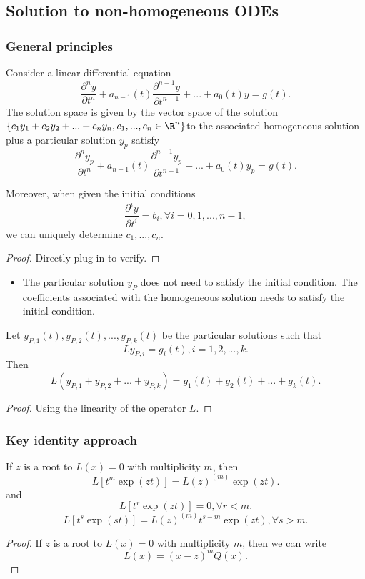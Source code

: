 \begin{refsection}
\subsection{Solution to non-homogeneous ODEs}
\subsubsection{General principles}
\begin{theorem}
	Consider a linear differential equation
	$$\frac{\partial^n y}{\partial t^n} + a_{n-1}(t)\frac{\partial^{n-1} y}{\partial t^{n-1}} + ... + a_0(t) y = g(t).$$
The solution space is given by the vector space of the solution $\{c_1y_1+c_2y_2 + ... + c_ny_n, c_1,...,c_n\in \R^n \}$to the associated homogeneous solution plus a particular solution $y_p$ satisfy
	$$\frac{\partial^n y_p}{\partial t^n} + a_{n-1}(t)\frac{\partial^{n-1} y_p}{\partial t^{n-1}} + ... + a_0(t) y_p = g(t).$$

Moreover, when given the initial conditions 
$$\frac{\partial^i y}{\partial t^i} = b_i, \forall i = 0,1,...,n-1,$$
we can uniquely determine $c_1,...,c_n$.
\end{theorem}
\begin{proof}
	Directly plug in to verify.
\end{proof}

\begin{remark}\hfill
\begin{itemize}
	\item The particular solution $y_P$ does not need to satisfy the initial condition. The coefficients associated with the homogeneous solution needs to satisfy the initial condition.
\end{itemize}	

\end{remark}



\begin{lemma}
Let $y_{P,1}(t),y_{P,2}(t),...,y_{P,k}(t)$ be the particular solutions such that
$$Ly_{P,i} = g_i(t), i=1,2,...,k.$$
Then
$$L(y_{P,1} + y_{P,2} + ... + y_{P,k}) = g_1(t) + g_2(t) + ... + g_k(t).$$	
\end{lemma}
\begin{proof}
Using the linearity of the operator $L$.
\end{proof}

\subsubsection{Key identity approach}
\begin{lemma}
	If $z$ is a root to $L(x) = 0$ with multiplicity $m$, then
	$$L[t^m\exp(zt)] = L(z)^{(m)}\exp(zt).$$	
	and
	$$L[t^r\exp(zt)] = 0, \forall r<m.$$	
	$$L[t^s\exp(st)] = L(z)^{(m)}t^{s-m}\exp(zt), \forall s>m.$$
\end{lemma}
\begin{proof}
If $z$ is a root to $L(x) = 0$ with multiplicity $m$, then we can write
$$L(x) = (x-z)^m Q(x).$$


\end{proof}
\end{refsection}
